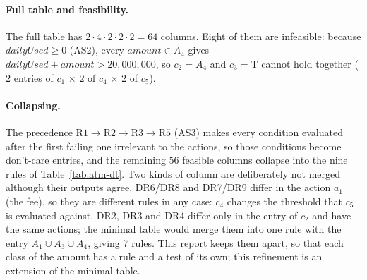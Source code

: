 \documentclass[11pt,a4paper]{article}
\begin{document}
\paragraph{Full table and feasibility.} The full table has
\(2\cdot4\cdot2\cdot2\cdot2=64\) columns. Eight of them are infeasible:
because \(\mathit{dailyUsed}\ge 0\) (AS2), every \(\mathit{amount}\in A_4\)
gives \(\mathit{dailyUsed}+\mathit{amount}>20{,}000{,}000\), so \(c_2=A_4\) and
\(c_3=\mathrm{T}\) cannot hold together (\(2\) entries of \(c_1\) \(\times\)
\(2\) of \(c_4\) \(\times\) \(2\) of \(c_5\)).

\paragraph{Collapsing.} The precedence
\(\mathrm{R1}\to\mathrm{R2}\to\mathrm{R3}\to\mathrm{R5}\) (AS3) makes every
condition evaluated after the first failing one irrelevant to the actions,
so those conditions become don't-care entries, and the remaining \(56\)
feasible columns collapse into the nine rules of Table~\ref{tab:atm-dt}.
Two kinds of column are deliberately not merged although their outputs
agree. DR6/DR8 and DR7/DR9 differ in the action \(a_1\) (the fee), so they
are different rules in any case: \(c_4\) changes the threshold that \(c_5\) is
evaluated against. DR2, DR3 and DR4 differ only in the entry of \(c_2\) and
have the same actions; the minimal table would merge them into one rule
with the entry \(A_1\cup A_3\cup A_4\), giving 7 rules. This report keeps
them apart, so that each class of the amount has a rule and a test of its
own; this refinement is an extension of the minimal table.
\end{document}
